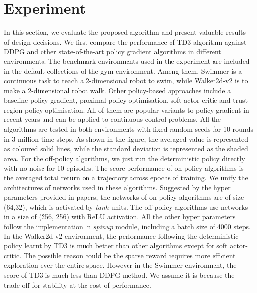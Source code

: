 \documentclass[oneside,11pt,a4paper]{article}
\begin{document}
\newpage
\section{Experiment}
In this section, we evaluate the proposed algorithm and present valuable results of design decisions.
\newline
\newline
\noindent
We first compare the performance of TD3 algorithm against DDPG and other state-of-the-art policy gradient algorithms in different environments. The benchmark environments used in the experiment are included in the default collections of the gym environment. Among them, Swimmer is a continuous task to teach a 2-dimensional robot to swim, while Walker2d-v2 is to make a 2-dimensional robot walk. Other policy-based approaches include a baseline policy gradient, proximal policy optimisation, soft actor-critic and trust region policy optimisation. All of them are popular variants to policy gradient in recent years and can be applied to continuous control problems.
\newline
\newline
\noindent
All the algorithms are tested in both environments with fixed random seeds for 10 rounds in 3 million time-steps. As shown in the figure, the averaged value is represented as coloured solid lines, while the standard deviation is represented as the shaded area. For the off-policy algorithms, we just run the deterministic policy directly with no noise for 10 episodes. The score performance of on-policy algorithms is the averaged total return on a trajectory across epochs of training. We unify the architectures of networks used in these algorithms. Suggested by the hyper parameters provided in papers, the networks of on-policy algorithms are of size (64,32), which is activated by \textit{tanh} units. The off-policy algorithms use networks in a size of (256, 256) with ReLU activation. All the other hyper parameters follow the implementation in \textit{spinup} module, including a batch size of 4000 steps.
\newline
\newline
\noindent
In the Walker2d-v2 environment, the performance following the deterministic policy learnt by TD3 is much better than other algorithms except for soft actor-critic. The possible reason could be the sparse reward requires more efficient exploration over the entire space. However in the Swimmer environment, the score of TD3 is much less than DDPG method. We assume it is because the trade-off for stability at the cost of performance.
\end{document}
